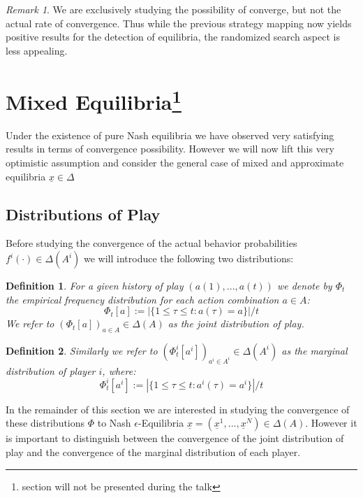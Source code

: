 \documentclass[a4paper]{article}
\theoremstyle{plain}
\newtheorem{definition}{Definition}
\theoremstyle{remark}
\newtheorem{remark}{Remark}
\newcommand{\eq}[1]{\underline{#1}}
\begin{document}
\begin{remark}
	We are exclusively studying the possibility of converge, but not the actual rate of convergence.
	Thus while the previous strategy mapping now yields positive results for the detection of equilibria,
	the randomized search aspect is less appealing.
\end{remark}


\section{Mixed Equilibria\protect\footnote{section will not be presented during the talk}}

Under the existence of pure Nash equilibria we have observed very satisfying results in terms of convergence
possibility. However we will now lift this very optimistic assumption and consider the general case of mixed and
approximate equilibria $\eq{x} \in \Delta$


\subsection{Distributions of Play}

Before studying the convergence of the actual behavior probabilities $f^i(\cdot) \in \Delta(A^i)$ we will
introduce the following two distributions:

\begin{definition}
	For a given history of play $(a(1), ..., a(t))$ we denote by $\Phi_t$  the empirical frequency
	distribution for each action combination $a \in A$:
	$$
		\Phi_t[a] := |\{ 1 \leq \tau \leq t : a(\tau) = a \}|/t
	$$
	We refer to $(\Phi_t[a])_{a \in A} \in \Delta(A)$ as the joint distribution of play.
\end{definition}
\begin{definition}
	Similarly we refer to $(\Phi_t^i[a^i])_{a^i \in A^i} \in \Delta(A^i)$ as the marginal distribution of player $i$, where:
	$$
		\Phi_t^i[a^i] := |\{ 1 \leq \tau \leq t : a^i(\tau) = a^i \}|/t
	$$
\end{definition}

In the remainder of this section we are interested in studying the convergence of these distributions $\Phi$ to Nash 
$\epsilon$-Equilibria $\eq{x} = (\eq{x}^1, ..., \eq{x}^N) \in \Delta(A)$.
However it is important to distinguish between the convergence of the joint distribution of play
and the convergence of the marginal distribution of each player.
\end{document}
